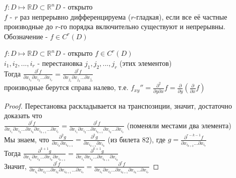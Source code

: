


\begin{definition} \thmslashn
	
$f : D \mapsto \mathbb{R}$\quad $D \subset \mathbb{R}^n$\quad $D$ - открыто\\
$f$ - $r$ раз непрерывно дифференцируема ($r$-гладкая), если все её частные производные до $r$-го порядка включительно существуют и непрерывны.\\
Обозначение - $f \in C^r(D)$
\end{definition}

\begin{theorem} \thmslashn
	
$f : D \mapsto \mathbb{R}$\quad $D \subset \mathbb{R}^n$\quad $D$ - открыто $f \in C^r(D)$\\
$i_1, i_2, ..., i_r$ - перестановка $j_1, j_2, ..., j_r$ (этих элементов)\\
Тогда $\frac{\partial^rf}{\partial x_{i_1}\partial x_{i_2}...\partial x_{i_r}} = \frac{\partial^rf}{\partial x_{j_1}\partial x_{j_2}...\partial x_{j_r}}$\\
производные берутся справа налево, т.е. $f_{xy}'' = \frac{\partial^2}{\partial y \partial x}f = \frac{\partial}{\partial y}(\frac{\partial}{\partial x}f)$

\begin{proof} \thmslashn

Перестановка раскладывается на транспозиции, значит, достаточно доказать что\\ $\frac{\partial^rf}{\partial x_{i_1}\partial x_{i_2}...\partial x_{i_k}\partial x_{i_{k+1}}...\partial x_{i_r}} = \frac{\partial^rf}{\partial x_{i_1}\partial x_{i_2}...\partial x_{i_{k+1}}\partial x_{i_{k}}...\partial x_{i_r}}$ (поменяли местами два элемента)\\
Мы знаем, что 
$\frac{\partial^{2}g}{\partial x_{i_k}\partial x_{i_{k+1}}} = \frac{\partial^{2}g}{\partial x_{i_{k+1}}\partial x_{i_{k}}}$ (из билета 82),  где $g = \frac{\partial^{r-k-1}f}{\partial x_{i_{k+2}}...\partial x_{i_r}}$ \\
Тогда 
$\frac{\partial^{k+1}g}{\partial x_{i_1}\partial x_{i_2}...\partial x_{i_k}\partial x_{i_{k+1}}} = \frac{\partial^{k+1}g}{\partial x_{i_1}\partial x_{i_2}...\partial x_{i_{k+1}}\partial x_{i_{k}}}$\\
Значит, $\frac{\partial^rf}{\partial x_{i_1}\partial x_{i_2}...\partial x_{i_k}\partial x_{i_{k+1}}...\partial x_{i_r}} = \frac{\partial^rf}{\partial x_{i_1}\partial x_{i_2}...\partial x_{i_{k+1}}\partial x_{i_{k}}...\partial x_{i_r}}$
\end{proof}
\end{theorem}


